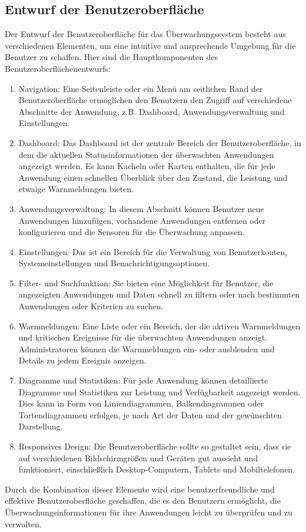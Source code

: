 \begin{flushleft}
		\subsection{Entwurf der Benutzeroberfläche}
			Der Entwurf der Benutzeroberfläche für das Überwachungssystem besteht aus verschiedenen Elementen, um eine intuitive und ansprechende Umgebung für die Benutzer zu schaffen. Hier sind die Hauptkomponenten des Benutzeroberflächenentwurfs:
			\begin{enumerate}
				\item Navigation: Eine Seitenleiste oder ein Menü am seitlichen Rand der Benutzeroberfläche ermöglichen den Benutzern den Zugriff auf verschiedene Abschnitte der Anwendung, \acs{z.B.} Dashboard, Anwendungsverwaltung und Einstellungen.
				\item Dashboard: Das Dashboard ist der zentrale Bereich der Benutzeroberfläche, in dem die aktuellen Statusinformationen der überwachten Anwendungen angezeigt werden. Es kann Kacheln oder Karten enthalten, die für jede Anwendung einen schnellen Überblick über den Zustand, die Leistung und etwaige Warnmeldungen bieten.
				\item Anwendungsverwaltung: In diesem Abschnitt können Benutzer neue Anwendungen hinzufügen, vorhandene Anwendungen entfernen oder konfigurieren und die Sensoren für die Überwachung anpassen.
				\item Einstellungen: Das ist ein Bereich für die Verwaltung von Benutzerkonten, Systemeinstellungen und Benachrichtigungsoptionen.
				\item Filter- und Suchfunktion: Sie bieten eine Möglichkeit für Benutzer, die angezeigten Anwendungen und Daten schnell zu filtern oder nach bestimmten Anwendungen oder Kriterien zu suchen.
				\item Warnmeldungen: Eine Liste oder ein Bereich, der die aktiven Warnmeldungen und kritischen Ereignisse für die überwachten Anwendungen anzeigt. Administratoren können die Warnmeldungen ein- oder ausblenden und Details zu jedem Ereignis anzeigen.
				\item Diagramme und Statistiken: Für jede Anwendung können detaillierte Diagramme und Statistiken zur Leistung und Verfügbarkeit angezeigt werden. Dies kann in Form von Liniendiagrammen, Balkendiagrammen oder Tortendiagrammen erfolgen, je nach Art der Daten und der gewünschten Darstellung.
				\item Responsives Design: Die Benutzeroberfläche sollte so gestaltet sein, dass sie auf verschiedenen Bildschirmgrößen und Geräten gut aussieht und funktioniert, einschließlich Desktop-Computern, Tablets und Mobiltelefonen.
			\end{enumerate}
			Durch die Kombination dieser Elemente wird eine benutzerfreundliche und effektive Benutzeroberfläche geschaffen, die es den Benutzern ermöglicht, die Überwachungsinformationen für ihre Anwendungen leicht zu überprüfen und zu verwalten.


\end{flushleft}
